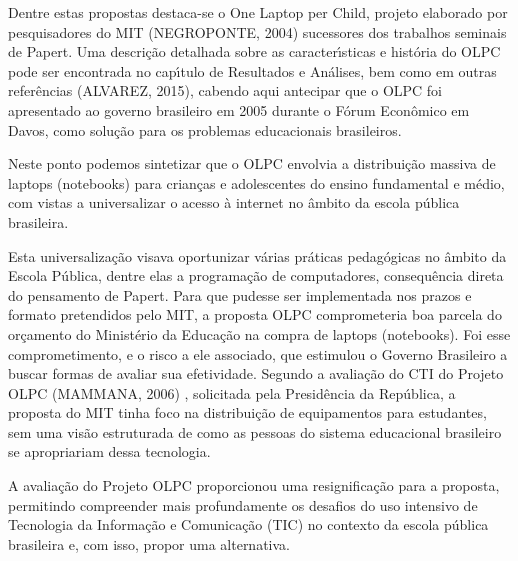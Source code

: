\documentclass[
12pt,		%
openright,	%
twoside,  %
a4paper,			%
chapter=TITLE,		%
english,			%
french,				%
spanish,			%
brazil				%
]{USPSC-classe/USPSC}
\begin{document}
Dentre estas propostas destaca-se o \textquotedbl One Laptop per Child\textquotedbl , projeto elaborado por pesquisadores do MIT  (NEGROPONTE, 2004)  sucessores dos trabalhos seminais de Papert. Uma descri\c{c}\~ao detalhada sobre as caracter\'{\i}sticas e hist\'oria do OLPC pode ser encontrada no cap\'{\i}tulo de Resultados e An\'alises, bem como em outras refer\^encias  (ALVAREZ, 2015), cabendo aqui antecipar que o OLPC foi apresentado ao governo brasileiro em 2005 durante o F\'orum Econ\^omico em Davos, como solu\c{c}\~ao para os problemas educacionais brasileiros.










Neste ponto podemos sintetizar que o OLPC envolvia a distribui\c{c}\~ao massiva de laptops (notebooks) para crian\c{c}as e adolescentes do  ensino fundamental e m\'edio, com vistas a universalizar o acesso \`a internet no \^ambito da escola p\'ublica brasileira.










Esta universaliza\c{c}\~ao visava oportunizar v\'arias pr\'aticas pedag\'ogicas no \^ambito da Escola P\'ublica, dentre elas a programa\c{c}\~ao de computadores, consequ\^encia direta do pensamento de Papert. Para que pudesse ser implementada nos prazos e formato pretendidos pelo MIT, a proposta OLPC comprometeria boa parcela do or\c{c}amento do Minist\'erio da Educa\c{c}\~ao na compra de laptops (notebooks). Foi esse comprometimento, e o risco a ele associado, que estimulou o Governo Brasileiro a buscar formas de avaliar sua efetividade. Segundo a avalia\c{c}\~ao do CTI do Projeto OLPC  (MAMMANA, 2006) , solicitada pela Presid\^encia da Rep\'ublica, a proposta do MIT tinha foco na distribui\c{c}\~ao de equipamentos para estudantes, sem uma vis\~ao estruturada de como as pessoas do sistema educacional brasileiro se apropriariam dessa tecnologia.










A avalia\c{c}\~ao do Projeto OLPC proporcionou uma resignifica\c{c}\~ao para a proposta, permitindo compreender mais profundamente os desafios do uso intensivo de Tecnologia da Informa\c{c}\~ao e Comunica\c{c}\~ao (TIC) no contexto da escola p\'ublica brasileira e, com isso, propor uma alternativa.
\end{document}
